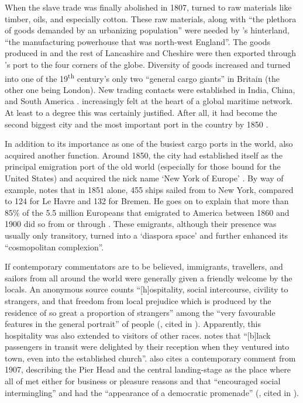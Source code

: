 When the slave trade was finally abolished in 1807,  turned to raw materials like timber, oils, and especially cotton.
These raw materials, along with ``the plethora of goods demanded by an urbanizing population'' were needed by 's hinterland, ``the manufacturing powerhouse that was north-west England''.
The goods produced in  and the rest of Lancashire and Cheshire were then exported through 's port to the four corners of the globe.
Diversity of goods increased and  turned into one of the 19\textsuperscript{th} century's only two ``general cargo giants'' in Britain (the other one being London).
New trading contacts were established in India, China, and South America \citep[cf.][258--259]{milne2006}.
 increasingly felt at the heart of a global maritime network.
At least to a degree this was certainly justified.
After all, it had become the second biggest city and the most important port in the country by 1850 \citep[cf.][113--114]{honeybone2007}.

In addition to its importance as one of the busiest cargo ports in the world,  also acquired another function.
Around 1850, the city had established itself as the principal emigration port of the old world (especially for those bound for the United States) and acquired the nick name `New York of Europe' \parencite[xxvii]{belchem2006c}.
By way of example, \citet[14]{belchem2006a} notes that in 1851 alone, 455 ships sailed from  to New York, compared to 124 for Le Havre and 132 for Bremen.
He goes on to explain that more than 85\% of the 5.5 million Europeans that emigrated to America between 1860 and 1900 did so from or through .
These emigrants, although their presence was usually only transitory, turned  into a `diaspora space' and further enhanced its ``cosmopolitan complexion''.

If contemporary commentators are to be believed, immigrants, travellers, and sailors from all around the world were generally given a friendly welcome by the locals.
An anonymous source counts ``[h]ospitality, social intercourse, civility to strangers, and that freedom from local prejudice which is produced by the residence of so great a proportion of strangers'' among the ``very favourable features in the general portrait'' of  people (\citealt{anon1812}, cited in \citealt[12]{crowley2012}).
Apparently, this hospitality was also extended to visitors of other races.
\citet[13]{belchem2006a} notes that ``[b]lack passengers in transit were delighted by their reception when they ventured into town, even into the established church''.
\citeauthor{belchem2006d} also cites a contemporary comment from 1907, describing the Pier Head and the central landing-stage as the place where all of  met either for business or pleasure reasons and that ``encouraged social intermingling'' and had the ``appearance of a democratic promenade'' (\citealt{scott1907}, cited in \citealt[45]{belchem2006d}).

